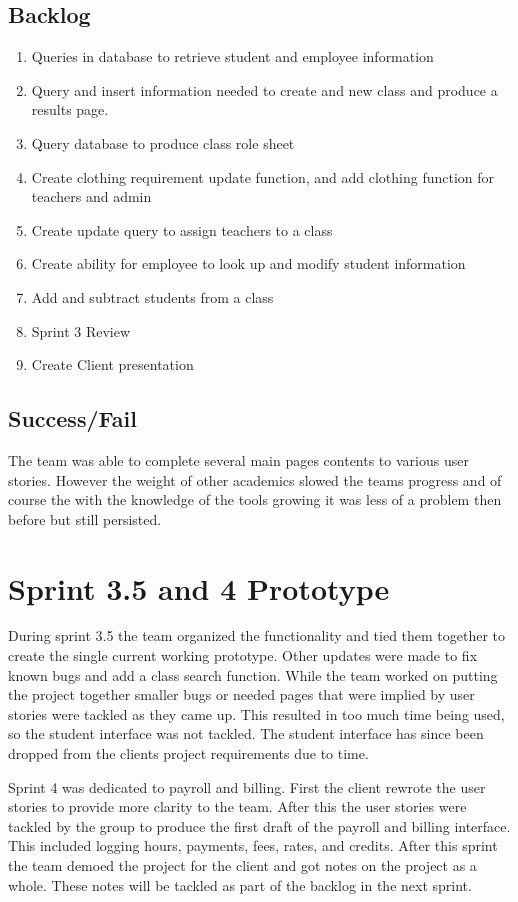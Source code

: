 \subsection{Backlog}

\begin{enumerate}
\item Queries in database to retrieve student and employee information
\item Query and insert information needed to create and new class and produce a results page.
\item Query database to produce class role sheet
\item Create clothing requirement update function, and add clothing function for teachers and admin
\item Create update query to assign teachers to a class
\item Create ability for employee to look up and modify student information
\item Add and subtract students from a class
\item Sprint 3 Review
\item Create Client presentation
\end{enumerate}

\subsection{Success/Fail}
The team was able to complete several main pages contents to various user stories. However the weight of other academics slowed the teams progress and of course the with the knowledge of the tools growing it was less of a problem then before but still persisted.\\

\section{Sprint 3.5 and 4 Prototype}
During sprint 3.5 the team organized the functionality and tied them together to create the single current working prototype. Other updates were made to fix known bugs and add a class search function. While the team worked on putting the project together smaller bugs or needed pages that were implied by user stories were tackled as they came up. This resulted in too much time being used, so the student interface was not tackled. The student interface has since been dropped from the clients project requirements due to time.

Sprint 4 was dedicated to payroll and billing. First the client rewrote the user stories to provide more clarity to the team. After this the user stories were tackled by the group to produce the first draft of the payroll and billing interface. This included logging hours, payments, fees, rates, and credits. After this sprint the team demoed the project for the client and got notes on the project as a whole. These notes will be tackled as part of the backlog in the next sprint.\\

